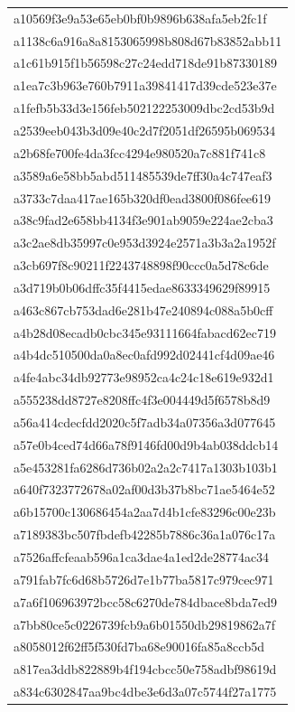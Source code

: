 \begin{tabular}{l}
a10569f3e9a53e65eb0bf0b9896b638afa5eb2fc1f \\
a1138c6a916a8a8153065998b808d67b83852abb11 \\
a1c61b915f1b56598c27c24edd718de91b87330189 \\
a1ea7c3b963e760b7911a39841417d39cde523e37e \\
a1fefb5b33d3e156feb502122253009dbc2cd53b9d \\
a2539eeb043b3d09e40c2d7f2051df26595b069534 \\
a2b68fe700fe4da3fcc4294e980520a7c881f741c8 \\
a3589a6e58bb5abd511485539de7ff30a4c747eaf3 \\
a3733c7daa417ae165b320df0ead3800f086fee619 \\
a38c9fad2e658bb4134f3e901ab9059e224ae2cba3 \\
a3c2ae8db35997c0e953d3924e2571a3b3a2a1952f \\
a3cb697f8c90211f2243748898f90ccc0a5d78c6de \\
a3d719b0b06dffc35f4415edae8633349629f89915 \\
a463c867cb753dad6e281b47e240894c088a5b0cff \\
a4b28d08ecadb0cbc345e93111664fabacd62ec719 \\
a4b4dc510500da0a8ec0afd992d02441cf4d09ae46 \\
a4fe4abc34db92773e98952ca4c24c18e619e932d1 \\
a555238dd8727e8208ffc4f3e004449d5f6578b8d9 \\
a56a414cdecfdd2020c5f7adb34a07356a3d077645 \\
a57e0b4ced74d66a78f9146fd00d9b4ab038ddcb14 \\
a5e453281fa6286d736b02a2a2c7417a1303b103b1 \\
a640f7323772678a02af00d3b37b8bc71ae5464e52 \\
a6b15700c130686454a2aa7d4b1cfe83296c00e23b \\
a7189383bc507fbdefb42285b7886c36a1a076c17a \\
a7526affcfeaab596a1ca3dae4a1ed2de28774ac34 \\
a791fab7fc6d68b5726d7e1b77ba5817c979cec971 \\
a7a6f106963972bcc58c6270de784dbace8bda7ed9 \\
a7bb80ce5c0226739fcb9a6b01550db29819862a7f \\
a8058012f62ff5f530fd7ba68e90016fa85a8ccb5d \\
a817ea3ddb822889b4f194cbcc50e758adbf98619d \\
a834c6302847aa9bc4dbe3e6d3a07c5744f27a1775 \\

\end{tabular}
